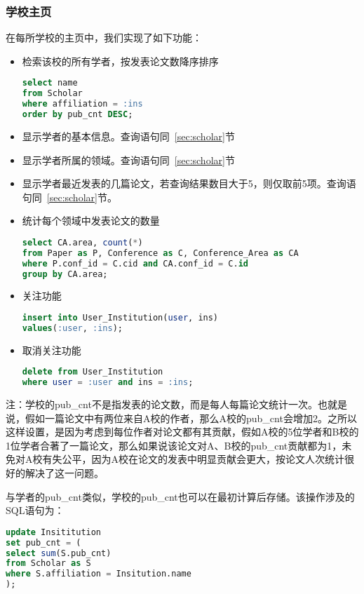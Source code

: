 \subsubsection{学校主页}
\label{sec:institution}
在每所学校的主页中，我们实现了如下功能：
\begin{itemize}
\item 检索该校的所有学者，按发表论文数降序排序
\begin{lstlisting}[language=SQL]
select name
from Scholar
where affiliation = :ins
order by pub_cnt DESC;
\end{lstlisting}
\item 显示学者的基本信息。查询语句同~\ref{sec:scholar}节
\item 显示学者所属的领域。查询语句同~\ref{sec:scholar}节
\item 显示学者最近发表的几篇论文，若查询结果数目大于5，则仅取前5项。查询语句同~\ref{sec:scholar}节。
\item 统计每个领域中发表论文的数量
\begin{lstlisting}[language=SQL]
select CA.area, count(*)
from Paper as P, Conference as C, Conference_Area as CA
where P.conf_id = C.cid and CA.conf_id = C.id
group by CA.area;
\end{lstlisting}
\item 关注功能
\begin{lstlisting}[language=SQL]
insert into User_Institution(user, ins)
values(:user, :ins);
\end{lstlisting}
\item 取消关注功能
\begin{lstlisting}[language=SQL]
delete from User_Institution
where user = :user and ins = :ins;
\end{lstlisting}
\end{itemize}
注：学校的pub\_cnt不是指发表的论文数，而是每人每篇论文统计一次。也就是说，假如一篇论文中有两位来自A校的作者，那么A校的pub\_cnt会增加2。之所以这样设置，是因为考虑到每位作者对论文都有其贡献，假如A校的5位学者和B校的1位学者合著了一篇论文，那么如果说该论文对A、B校的pub\_cnt贡献都为1，未免对A校有失公平，因为A校在论文的发表中明显贡献会更大，按论文人次统计很好的解决了这一问题。

与学者的pub\_cnt类似，学校的pub\_cnt也可以在最初计算后存储。该操作涉及的SQL语句为：
\begin{lstlisting}[language=SQL]
update Insititution
set pub_cnt = (
select sum(S.pub_cnt)
from Scholar as S
where S.affiliation = Insitution.name
);
\end{lstlisting}

